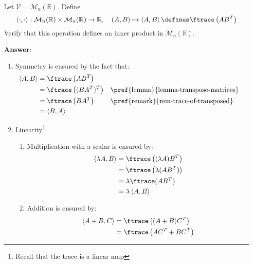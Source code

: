 \begin{exm}\label{exm-inner-product:3}
	Let $\mathcal{V}=\mathcal{M}_n(\mathbb{R})$. Define
	\begin{equation}
		\left<\cdot,\cdot\right>:\mathcal{M}_n(\mathbb{R})\times\mathcal{M}_n(\mathbb{R})\to\mathbb{R},
		\quad(A,B)\mapsto\left<A,B\right>\defines\ftrace\left(AB^T\right)
	\end{equation}
	Verify that this operation defines an inner product in $\mathcal{M}_n(\mathbb{R})$.
	\begin{flushleft}
		\textbf{Answer}:
		\begin{enumerate}
			\item Symmetry is ensured by the fact that:
			      \begin{align*}
				      \left<A,B\right> & = \ftrace\left(AB^T\right)                                                        \\
				                       & = \ftrace\left((BA^T)^T\right) &  & \text{\pref{lemma}{lemma-transpose-matrices}} \\
				                       & = \ftrace\left(BA^T\right)     &  & \text{\pref{remark}{rem-trace-of-transposed}} \\
				                       & = \left<B,A\right>
			      \end{align*}
			\item Linearity\footnote{Recall that the trace is a linear map}
			      \begin{enumerate}
				      \item Multiplication with a scalar is ensured by:
				            \begin{align*}
					            \left<\lambda A, B\right> & = \ftrace\left((\lambda A)B^T\right) \\
					                                      & = \ftrace\left(\lambda (AB^T)\right) \\
					                                      & = \lambda\ftrace(AB^T)               \\
					                                      & = \lambda\left<A,B\right>
				            \end{align*}
				      \item Addition is ensured by:
				            \begin{align*}
					            \left<A+B,C\right> & = \ftrace\left((A+B)C^T\right)                        \\
					                               & = \ftrace\left(AC^T+BC^T\right)                       \\

\end{align*}
\end{enumerate}
\end{enumerate}
\end{flushleft}
\end{exm}
